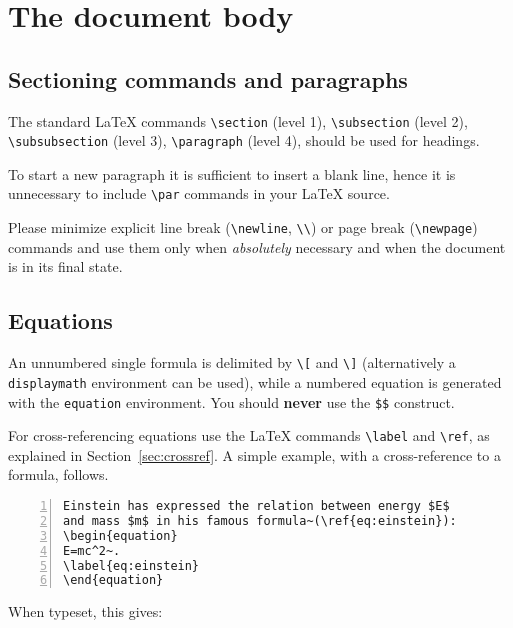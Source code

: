 \documentclass{cernphprep}
\begin{document}
\section{The document body}

\subsection{Sectioning commands and paragraphs}
\label{sec:sections}

The standard \LaTeX{} commands \verb!\section! (level 1),
\verb!\subsection! (level 2), \verb!\subsubsection! (level 3),
\verb!\paragraph! (level 4), should be used for headings. 

To start a new paragraph it is sufficient to insert a blank line,
hence it is unnecessary to include \verb!\par! commands in your
\LaTeX{} source.

Please minimize explicit line break (\verb!\newline!, \verb!\\!) or
page break (\verb!\newpage!) commands and use them only when
\emph{absolutely} necessary and when the document is in its final
state.

\subsection{Equations}
\label{sec:equations}

An unnumbered single formula is delimited by \verb!\[! and \verb!\]!
(alternatively a \texttt{displaymath} environment can be used), while a
numbered equation is generated with the \texttt{equation} environment.
You should \textbf{never} use the \texttt{\$\$} construct.  

For cross-referencing equations use the \LaTeX{} commands \verb!\label!
and \verb!\ref!, as explained in Section~\ref{sec:crossref}.
A simple example, with a cross-reference to a formula, follows.
\begin{Verbatim}[numbers=left,fontsize=\small]
Einstein has expressed the relation between energy $E$ 
and mass $m$ in his famous formula~(\ref{eq:einstein}):
\begin{equation}
E=mc^2~.
\label{eq:einstein}
\end{equation}
\end{Verbatim}
When typeset, this gives:
\end{document}
